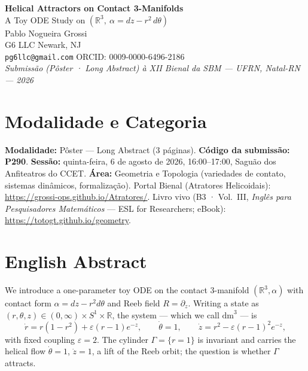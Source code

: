 \documentclass[11pt,a4paper]{article}
\theoremstyle{plain}
\begin{document}
\begin{center}
  {\Large\bfseries Helical Attractors on Contact 3-Manifolds}\\[3pt]
  {\normalsize A Toy ODE Study on $(\mathbb{R}^3,\ \alpha = dz - r^2\,d\theta)$}\\[10pt]
  {\normalsize Pablo Nogueira Grossi}\\[2pt]
  {\footnotesize G6 LLC \;\textbullet\; Newark, NJ}\\[1pt]
  {\footnotesize \texttt{pg6llc@gmail.com} \;\textbullet\; ORCID: 0009-0000-6496-2186}\\[9pt]
  {\footnotesize\itshape Submissão (Pôster · Long Abstract) à XII Bienal da SBM — UFRN, Natal-RN — 2026}
\end{center}
\vspace{4pt}

\section*{Modalidade e Categoria}
\noindent
\textbf{Modalidade:} Pôster — Long Abstract (3 páginas). \textbf{Código da submissão:} \textbf{P290}.
\textbf{Sessão:} quinta-feira, 6 de agosto de 2026, 16:00–17:00, Saguão dos Anfiteatros do CCET.
\textbf{Área:} Geometria e Topologia (variedades de contato, sistemas dinâmicos, formalização).
Portal Bienal (Atratores Helicoidais): \url{https://grossi-ops.github.io/Atratores/}.
Livro vivo (B3 · Vol.~III, \emph{Inglês para Pesquisadores Matemáticos} — ESL for Researchers;
eBook): \url{https://totogt.github.io/geometry}.

\section*{English Abstract}
We introduce a one-parameter toy ODE on the contact 3-manifold $(\mathbb{R}^3,\alpha)$ with contact
form $\alpha = dz - r^2 d\theta$ and Reeb field $R = \partial_z$. Writing a state as
$(r,\theta,z) \in (0,\infty)\times S^1 \times \mathbb{R}$, the system — which we call $\mathrm{dm}^3$ — is
\begin{equation}
  \dot r = r(1-r^2) + \varepsilon (r-1)e^{-z},
  \qquad \dot\theta = 1,
  \qquad \dot z = r^2 - \varepsilon (r-1)^2 e^{-z},
\end{equation}
with fixed coupling $\varepsilon = 2$. The cylinder $\Gamma = \{r=1\}$ is invariant and carries the
helical flow $\dot\theta = 1$, $\dot z = 1$, a lift of the Reeb orbit; the question is whether
$\Gamma$ attracts.
\end{document}
